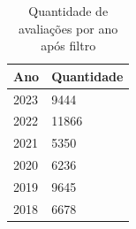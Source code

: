 \begin{table}[]
	\centering
	\begin{tabular}{|l|l|}
		\hline
		\textbf{Ano} & \textbf{Quantidade} \\\hline
		2023         & 9444                \\
		2022         & 11866               \\
		2021         & 5350                \\
		2020         & 6236                \\
		2019         & 9645                \\
		2018         & 6678                \\
		\hline
	\end{tabular}
	\caption{Quantidade de avaliações por ano após filtro}
	\label{table:distribuicao_review_per_year}
\end{table}

